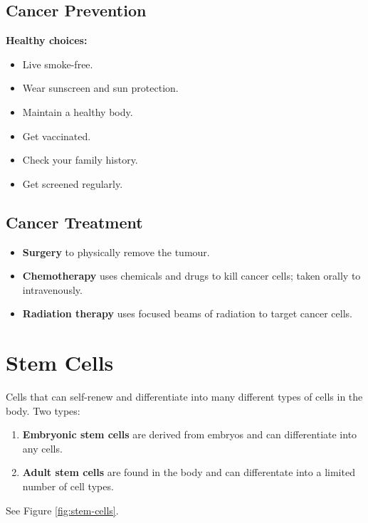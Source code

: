 \documentclass[12pt]{report}
\begin{document}
\newpage
\subsection{Cancer Prevention}
\textbf{Healthy choices:}
\begin{itemize}
    \item{Live smoke-free.}
    \item{Wear sunscreen and sun protection.}
    \item{Maintain a healthy body.}
    \item{Get vaccinated.}
    \item{Check your family history.}
    \item{Get screened regularly.}
\end{itemize}

\subsection{Cancer Treatment}
\begin{itemize}
    \item{ \textbf{Surgery} to physically remove the tumour.}
    \item{ \textbf{Chemotherapy} uses chemicals and drugs to kill cancer cells; taken orally to intravenously.}
    \item{ \textbf{Radiation therapy} uses focused beams of radiation to target cancer cells.}
\end{itemize}

\section{Stem Cells}
\begin{definition}
    Cells that can self-renew and differentiate into many different types of cells in the body. Two types: 
    \begin{enumerate}
    \setlength\itemsep{0.5em}
        \item{\textbf{Embryonic stem cells} are derived from embryos and can differentiate into any cells.}
        \item{\textbf{Adult stem cells} are found in the body and can differentate into a limited number of cell types.}
    \end{enumerate}
    See Figure \ref{fig:stem-cells}.
\end{definition}
\end{document}
